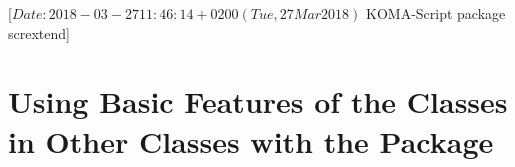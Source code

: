 %
%
%
%
%
%
%
%
% 
%
%
%
%

                 [$Date: 2018-03-27 11:46:14 +0200 (Tue, 27 Mar 2018) $
                  KOMA-Script package scrextend]


\chapter[{\KOMAScript{} Features for Other Classes with \Package{scrextend}}]
  {Using Basic Features of the \KOMAScript{} Classes in Other Classes with the
     Package}
\BeginIndexGroup%
%

